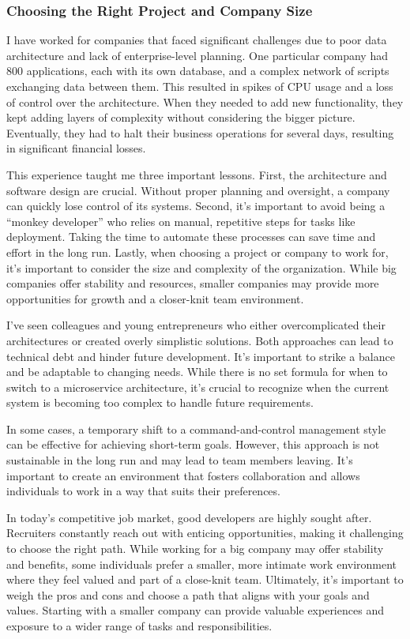 \subsubsection{Choosing the Right Project and Company Size}

I have worked for companies that faced significant challenges due to
poor data architecture and lack of enterprise-level planning. One
particular company had 800 applications, each with its own database, and
a complex network of scripts exchanging data between them. This resulted
in spikes of CPU usage and a loss of control over the architecture. When
they needed to add new functionality, they kept adding layers of
complexity without considering the bigger picture. Eventually, they had
to halt their business operations for several days, resulting in
significant financial losses.

This experience taught me three important lessons. First, the
architecture and software design are crucial. Without proper planning
and oversight, a company can quickly lose control of its systems.
Second, it's important to avoid being a ``monkey developer'' who relies
on manual, repetitive steps for tasks like deployment. Taking the time
to automate these processes can save time and effort in the long run.
Lastly, when choosing a project or company to work for, it's important
to consider the size and complexity of the organization. While big
companies offer stability and resources, smaller companies may provide
more opportunities for growth and a closer-knit team environment.

I've seen colleagues and young entrepreneurs who either overcomplicated
their architectures or created overly simplistic solutions. Both
approaches can lead to technical debt and hinder future development.
It's important to strike a balance and be adaptable to changing needs.
While there is no set formula for when to switch to a microservice
architecture, it's crucial to recognize when the current system is
becoming too complex to handle future requirements.

In some cases, a temporary shift to a command-and-control management
style can be effective for achieving short-term goals. However, this
approach is not sustainable in the long run and may lead to team members
leaving. It's important to create an environment that fosters
collaboration and allows individuals to work in a way that suits their
preferences.

In today's competitive job market, good developers are highly sought
after. Recruiters constantly reach out with enticing opportunities,
making it challenging to choose the right path. While working for a big
company may offer stability and benefits, some individuals prefer a
smaller, more intimate work environment where they feel valued and part
of a close-knit team. Ultimately, it's important to weigh the pros and
cons and choose a path that aligns with your goals and values. Starting
with a smaller company can provide valuable experiences and exposure to
a wider range of tasks and responsibilities.


